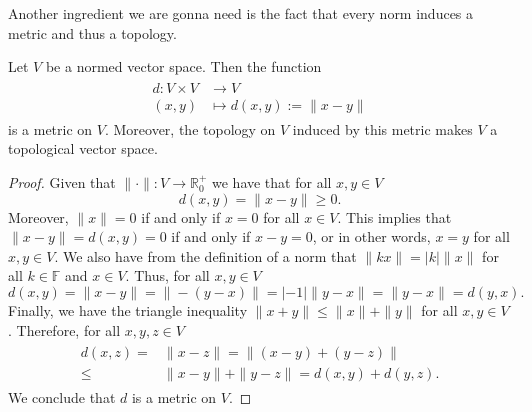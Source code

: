 Another ingredient we are gonna need is the fact that every norm induces a metric and thus a topology.

\begin{theorem}
	Let $V$ be a normed vector space. Then the function 
	\begin{align}\label{eq:norm_metric}
	\begin{split}
		d:V\times V&\rightarrow V\\
		(x,y)&\mapsto d(x,y):=\|x-y\|
	\end{split}
	\end{align}
is a metric on $V$. Moreover, the topology on $V$ induced by this metric makes $V$ a topological vector space.
\end{theorem}

\begin{proof}
	Given that $\|\cdot\|:V\rightarrow\mathbb{R}^+_0$ we have that for all $x,y\in V$ 
	\begin{equation}
		d(x,y)=\|x-y\|\geq 0.
	\end{equation}
Moreover, $\|x\|=0$ if and only if $x=0$ for all $x\in V$. This implies that $\|x-y\|=d(x,y)=0$ if and only if $x-y=0$, or in other words, $x=y$ for all $x,y\in V$. We also have from the definition of a norm that $\|kx\|=|k|\|x\|$ for all $k\in\mathbb{F}$ and $x\in V$. Thus, for all $x,y\in V$
	\begin{equation}
		d(x,y)=\|x-y\|=\|-(y-x)\|=|-1|\|y-x\|=\|y-x\|=d(y,x).
	\end{equation}
Finally, we have the triangle inequality $\|x+y\|\leq\|x\|+\|y\|$ for all $x,y\in V$. Therefore, for all $x,y,z\in V$
	\begin{align}
	\begin{split}
		d(x,z)=&\|x-z\|=\|(x-y)+(y-z)\|\\
		\leq&\|x-y\|+\|y-z\|=d(x,y)+d(y,z).
	\end{split}
	\end{align}
We conclude that $d$ is a metric on $V$.


\end{proof}
